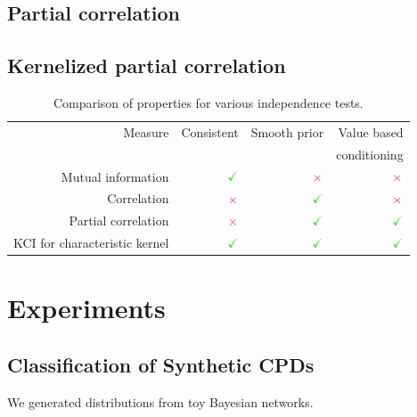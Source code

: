 \documentclass{article} %
\begin{document}
\subsection{Partial correlation}

\subsection{Kernelized partial correlation}


\begin{table}[t]
\centering
\tiny
\begin{tabular}{rrrr}
\hline
Measure & Consistent & Smooth prior& Value based\\
& & & conditioning\\
\hline
Mutual information & $\color{LimeGreen} \checkmark $ & $\color{Maroon}\times$ & $\color{Maroon}\times$ \\
Correlation & $\color{Maroon}\times$  & $\color{LimeGreen} \checkmark $ & $\color{Maroon}\times$ \\
Partial correlation & $\color{Maroon}\times$  & $\color{LimeGreen} \checkmark $ & $\color{LimeGreen}\checkmark$ \\
KCI for characteristic kernel & $\color{LimeGreen}\checkmark$  & $\color{LimeGreen} \checkmark $ & $\color{LimeGreen}\checkmark$ \\
\hline
\end{tabular}
\caption{Comparison of properties for various independence tests.}
\label{eval}
\end{table}


\section{Experiments}

\subsection{Classification of Synthetic CPDs}
We generated distributions from toy Bayesian networks.
\end{document}
